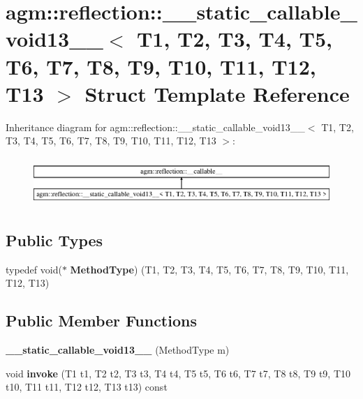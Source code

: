 \hypertarget{structagm_1_1reflection_1_1____static__callable__void13____}{}\section{agm\+:\+:reflection\+:\+:\+\_\+\+\_\+static\+\_\+callable\+\_\+void13\+\_\+\+\_\+$<$ T1, T2, T3, T4, T5, T6, T7, T8, T9, T10, T11, T12, T13 $>$ Struct Template Reference}
\label{structagm_1_1reflection_1_1____static__callable__void13____}
Inheritance diagram for agm\+:\+:reflection\+:\+:\+\_\+\+\_\+static\+\_\+callable\+\_\+void13\+\_\+\+\_\+$<$ T1, T2, T3, T4, T5, T6, T7, T8, T9, T10, T11, T12, T13 $>$\+:\begin{figure}[H]
\begin{center}
\leavevmode
\includegraphics[height=1.857380cm]{structagm_1_1reflection_1_1____static__callable__void13____}
\end{center}
\end{figure}
\subsection*{Public Types}
\begin{DoxyCompactItemize}
\item 
typedef void($\ast$ {\bfseries Method\+Type}) (T1, T2, T3, T4, T5, T6, T7, T8, T9, T10, T11, T12, T13)\hypertarget{structagm_1_1reflection_1_1____static__callable__void13_____a7c6900a53468dd66ef6fd08f17c3db58}{}\label{structagm_1_1reflection_1_1____static__callable__void13_____a7c6900a53468dd66ef6fd08f17c3db58}

\end{DoxyCompactItemize}
\subsection*{Public Member Functions}
\begin{DoxyCompactItemize}
\item 
{\bfseries \+\_\+\+\_\+static\+\_\+callable\+\_\+void13\+\_\+\+\_\+} (Method\+Type m)\hypertarget{structagm_1_1reflection_1_1____static__callable__void13_____a78be3d87401df6cb7ad9dae8659b4fee}{}\label{structagm_1_1reflection_1_1____static__callable__void13_____a78be3d87401df6cb7ad9dae8659b4fee}

\item 
void {\bfseries invoke} (T1 t1, T2 t2, T3 t3, T4 t4, T5 t5, T6 t6, T7 t7, T8 t8, T9 t9, T10 t10, T11 t11, T12 t12, T13 t13) const \hypertarget{structagm_1_1reflection_1_1____static__callable__void13_____a28c13c4f804a07c7823eee670ffec4f2}{}\label{structagm_1_1reflection_1_1____static__callable__void13_____a28c13c4f804a07c7823eee670ffec4f2}

\end{DoxyCompactItemize}
